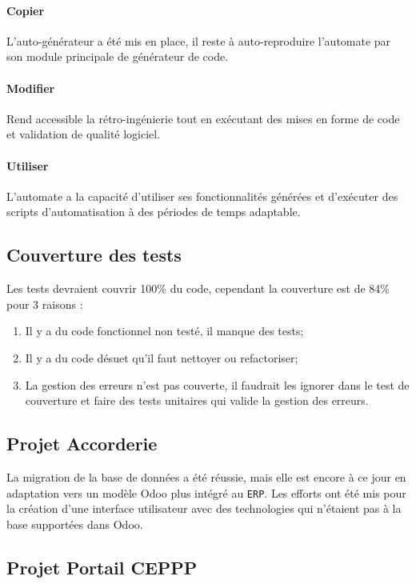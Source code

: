 \paragraph{Copier}
L’auto-générateur a été mis en place, il reste à auto-reproduire l’automate par son module principale de générateur de code.

\paragraph{Modifier}
Rend accessible la rétro-ingénierie tout en exécutant des mises en forme de code et validation de qualité logiciel.

\paragraph{Utiliser}
L’automate a la capacité d’utiliser ses fonctionnalités générées et d’exécuter des scripts d’automatisation à des périodes de temps adaptable.

\subsection{Couverture des tests}

Les tests devraient couvrir 100\% du code, cependant la couverture est de 84\% pour 3 raisons :

\begin{enumerate}
    \item Il y a du code fonctionnel non testé, il manque des tests;
    \item Il y a du code désuet qu’il faut nettoyer ou refactoriser;
    \item La gestion des erreurs n’est pas couverte, il faudrait les ignorer dans le test de couverture et faire des tests unitaires qui valide la gestion des erreurs.
\end{enumerate}

\subsection{Projet Accorderie}
La migration de la base de données a été réussie, mais elle est encore à ce jour en adaptation vers un modèle Odoo plus intégré au \texttt{ERP}. Les efforts ont été mis pour la création d’une interface utilisateur avec des technologies qui n’étaient pas à la base supportées dans Odoo.

\subsection{Projet Portail CEPPP}

